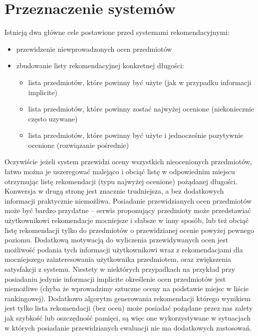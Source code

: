 \documentclass{pracamgr}
\begin{document}
  \section{Przeznaczenie systemów}
   Istnieją dwa główne cele postawione przed systemami rekomendacyjnymi:
   \begin{itemize}\itemsep1pt \parskip0pt 
    \item przewidzenie niewprowadzonych ocen przedmiotów   
    \item zbudowanie listy rekomendacyjnej konkretnej długości:
      \begin{itemize}\itemsep1pt \parskip0pt 
	\item lista przedmiotów, które powinny być użyte (jak w przypadku informacji implicite)
	\item lista przedmiotów, które powinny zostać najwyżej ocenione (niekoniecznie często uzywane)
	\item lista przedmiotów, które powinny być użyte i jednocześnie pozytywnie ocenione (rozwiązanie pośrednie)
      \end{itemize}
   \end{itemize}
   Oczywiście jeżeli system przewidzi oceny wszystkich nieocenionych przedmiotów,
   łatwo można je uszeregować malejąco i obciąć listę w odpowiednim miejscu otrzymując listę rekomendacji (typu najwyżej ocenione) pożądanej długości.\newline
   Konwersja w drugą stronę jest znacznie trudniejsza, a bez dodatkowych informacji praktycznie niemożliwa.\newline
   Posiadanie przewidzianych ocen przedmiotów może być bardzo przydatne -- serwis proponujący przedmioty może przedstawiać użytkownikowi
   rekomendacje mocniejsze i słabsze w inny sposób, lub też obciąć listę rekomendacji tylko do przedmiotów o przewidzianej ocenie powyżej pewnego poziomu.
   Dodatkową motywacją do wyliczenia przewidywanych ocen jest możliwość podania tych informacji użytkownikowi wraz z rekomendacjami
   dla mocniejszego zainteresowania użytkownika przedmiotem, oraz zwiększenia satysfakcji z systemu.\newline
   Niestety w niektórych przypadkach na przykład przy posiadaniu jedynie informacji implicite określenie ocen przedmiotów jest niemożliwe
   (chyba że wprowadzimy sztuczne oceny na podstawie miejsc w liście rankingowej). Dodatkowo algorytm generowania rekomendacji którego wynikiem
   jest tylko lista rekomendacji (bez ocen) może posiadać pożądane przez nas zalety jak szybkość lub oszczędność pamięci,
   są więc one wykorzystywane w sytuacjach w których posiadanie przewidzianych ewaluacji nie ma dodatkowych zastosowań.
   
\end{document}
